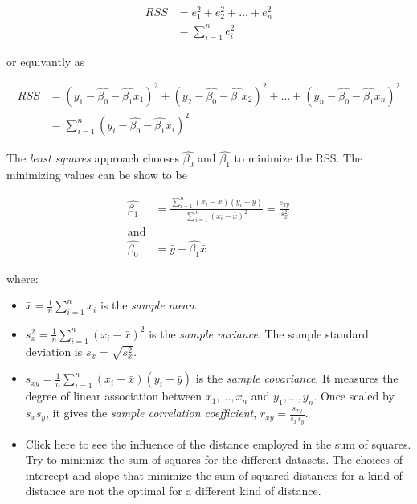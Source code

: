 \documentclass[]{book}
\providecommand{\tightlist}{%
  \setlength{\itemsep}{0pt}\setlength{\parskip}{0pt}}
\newenvironment{rmdblock}[1]
  {\begin{shaded*}
  \begin{itemize}
  \renewcommand{\labelitemi}{
    \raisebox{-.7\height}[0pt][0pt]{
      {\setkeys{Gin}{width=2em,keepaspectratio}\texttt{[image: img/icons/\#1]}}
    }
  }
  \item
  }
  {
  \end{itemize}
  \end{shaded*}
  }
\newenvironment{rmdinsight}
  {\begin{rmdblock}{insight}}
  {\end{rmdblock}}
\begin{document}
\[  \begin{aligned}
RSS &= e_1^2 + e_2^2 + \ldots + e_n^2 \\
    &= \sum_{i=1}^{n} e_i^2
 \end{aligned}  \]

or equivantly as

\[ \begin{aligned}
RSS &= (y_1 - \hat{\beta_0} - \hat{\beta_1} x_1)^2 + (y_2 - \hat{\beta_0} - \hat{\beta_1} x_2)^2 + \ldots + (y_n - \hat{\beta_0} - \hat{\beta_1} x_n)^2 \\
    &= \sum_{i=1}^{n} (y_i - \hat{\beta_0} - \hat{\beta_1} x_i)^2
\end{aligned} \]

The \emph{least squares} approach chooses \(\hat{\beta_0}\) and
\(\hat{\beta_1}\) to minimize the RSS. The minimizing values can be show
to be

\[  \begin{aligned}
\hat{\beta_1} &=  \frac{\sum_{i=1}^{n} (x_i - \bar{x})(y_i - \bar{y})  }{\sum_{i=1}^{n} (x_i - \bar{x})^2 } = \frac{s_{xy}}{s_x^2} \\
\text{and} \\
\hat{\beta_0} &= \bar{y} - \hat{\beta_1} \bar{x}
\end{aligned}  \]

where:

\begin{itemize}
\tightlist
\item
  \(\bar{x}=\frac{1}{n}\sum_{i=1}^nx_i\) is the \emph{sample mean}.
\item
  \(s_x^2=\frac{1}{n}\sum_{i=1}^n(x_i-\bar{x})^2\) is the \emph{sample
  variance}. The sample standard deviation is \(s_x=\sqrt{s_x^2}\).
\item
  \(s_{xy}=\frac{1}{n}\sum_{i=1}^n(x_i-\bar{x})(y_i-\bar{y})\) is the
  \emph{sample covariance}. It measures the degree of linear association
  between \(x_1,\ldots,x_n\) and \(y_1,\ldots,y_n\). Once scaled by
  \(s_xs_y\), it gives the \emph{sample correlation coefficient},
  \(r_{xy}=\frac{s_{xy}}{s_xs_y}\).
\end{itemize}

\begin{rmdinsight}
Click here to see the influence of the distance employed in the sum of
squares. Try to minimize the sum of squares for the different datasets.
The choices of intercept and slope that minimize the sum of squared
distances for a kind of distance are not the optimal for a different
kind of distance.
\end{rmdinsight}
\end{document}
